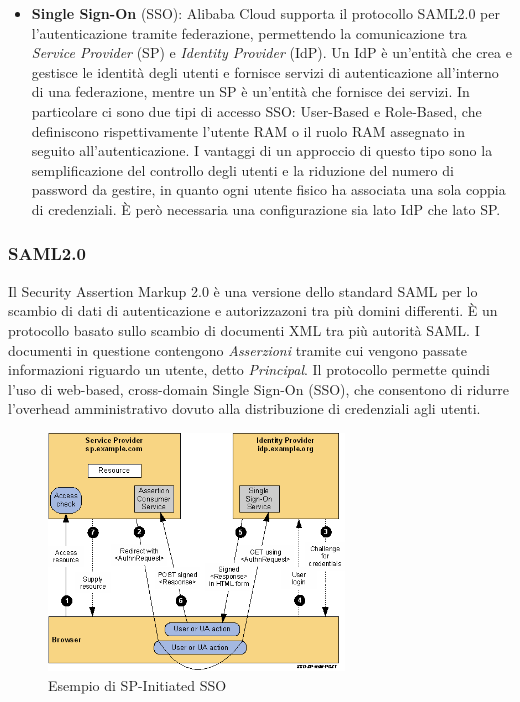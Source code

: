 \documentclass[a4paper]{article}
\begin{document}
\begin{itemize}
    \item{\textbf{Single Sign-On} (SSO)}: Alibaba Cloud supporta il protocollo SAML2.0 per l'autenticazione tramite federazione, permettendo la comunicazione tra \textit{Service Provider} (SP) e \textit{Identity Provider} (IdP). Un IdP è un'entità che crea e gestisce le identità degli utenti e fornisce servizi di autenticazione all'interno di una federazione, mentre un SP è un'entità che fornisce dei servizi.
    In particolare ci sono due tipi di accesso SSO: User-Based e Role-Based, che definiscono rispettivamente l'utente RAM o il ruolo RAM assegnato in seguito all'autenticazione. I vantaggi di un approccio di questo tipo sono la semplificazione del controllo degli utenti e la riduzione del numero di password da gestire, in quanto ogni utente fisico ha associata una sola coppia di credenziali. È però necessaria una configurazione sia lato IdP che lato SP.\cite{alibaba_sso}
\end{itemize}

\subsubsection{SAML2.0}
Il Security Assertion Markup 2.0 è una versione dello standard SAML per lo scambio di dati di autenticazione e autorizzazoni tra più domini differenti. È un protocollo basato sullo scambio di documenti XML tra più autorità SAML. I documenti in questione contengono \textit{Asserzioni} tramite cui vengono passate informazioni riguardo un utente, detto \textit{Principal}. Il protocollo permette quindi l'uso di web-based, cross-domain Single Sign-On (SSO), che consentono di ridurre l'overhead amministrativo dovuto alla distribuzione di credenziali agli utenti.

\begin{figure}[ht]
    \centering
    \includegraphics[width=0.7\textwidth]{Risorse/saml.png}
    \caption{Esempio di SP-Initiated SSO}
\end{figure}
\end{document}
